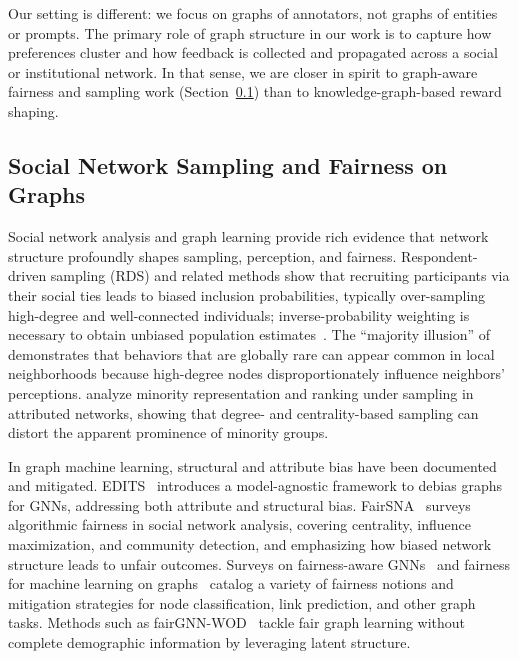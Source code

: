 \documentclass{article}
\theoremstyle{plain}
\theoremstyle{definition}
\theoremstyle{remark}
\begin{document}
Our setting is different: we focus on graphs of annotators, not graphs of entities or prompts.
The primary role of graph structure in our work is to capture how preferences cluster and how feedback is collected and propagated across a social or institutional network.
In that sense, we are closer in spirit to graph-aware fairness and sampling work (Section~\ref{sec:rw_network_bias}) than to knowledge-graph-based reward shaping.

\subsection{Social Network Sampling and Fairness on Graphs}
\label{sec:rw_network_bias}

Social network analysis and graph learning provide rich evidence that network structure profoundly shapes sampling, perception, and fairness.
Respondent-driven sampling (RDS) and related methods show that recruiting participants via their social ties leads to biased inclusion probabilities, typically over-sampling high-degree and well-connected individuals; inverse-probability weighting is necessary to obtain unbiased population estimates~\citep{wejnert2010rds}.
The ``majority illusion'' of \citet{lerman2016majorityillusion} demonstrates that behaviors that are globally rare can appear common in local neighborhoods because high-degree nodes disproportionately influence neighbors’ perceptions.
\citet{antunes2024minorityranking} analyze minority representation and ranking under sampling in attributed networks, showing that degree- and centrality-based sampling can distort the apparent prominence of minority groups.

In graph machine learning, structural and attribute bias have been documented and mitigated.
EDITS~\citep{dong2021edits} introduces a model-agnostic framework to debias graphs for GNNs, addressing both attribute and structural bias.
FairSNA~\citep{saxena2024fairsna} surveys algorithmic fairness in social network analysis, covering centrality, influence maximization, and community detection, and emphasizing how biased network structure leads to unfair outcomes.
Surveys on fairness-aware GNNs~\citep{chen2023fairgnn_survey} and fairness for machine learning on graphs~\citep{laclau2024fairness_graphs_survey} catalog a variety of fairness notions and mitigation strategies for node classification, link prediction, and other graph tasks.
Methods such as fairGNN-WOD~\citep{wang2025fairgnn_wod} tackle fair graph learning without complete demographic information by leveraging latent structure.
\end{document}
